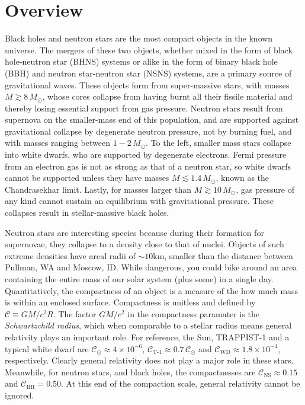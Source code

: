 \chapter{Overview}
\label{chap:chapter-1}


Black holes and neutron stars are the most compact objects in the known universe.  
The mergers of these two objects,
 whether mixed in the form of black hole-neutron star (BHNS) systems or alike in the form of binary black hole (BBH) and neutron star-neutron star (NSNS) systems,
 are a primary source of gravitational waves.  
These objects form from super-massive stars,
 with masses $M\gtrsim 8\,M_{\odot}$,
 whose cores collapse from having burnt all their fissile material and thereby
 losing essential support from gas pressure.
Neutron stars result from supernova on the smaller-mass end of this population,
 and are supported against gravitational collapse by degenerate neutron pressure,
 not by burning fuel,
 and with masses ranging between $1-2\,M_{\odot}$.
To the left,
 smaller mass stars collapse into white dwarfs,
 who are supported by degenerate electrons.  
Fermi pressure from an electron gas is not as strong as that of a neutron star,
 so white dwarfs cannot be supported unless they have masses $M\lesssim 1.4\,M_{\odot}$,
 known as the Chandrasekhar limit.  
Lastly, for masses larger than $M\gtrsim 10\,M_{\odot}$,
 gas pressure of any kind cannot sustain an equilibrium with gravitational pressure.  
These collapses result in stellar-massive black holes.

Neutron stars are interesting species because during their formation for supernovae,
 they collapse to a density close to that of nuclei.
Objects of such extreme densities have areal radii of $\sim 10 \textrm{km}$,
 smaller than the distance between Pullman, WA and Moscow, ID.
While dangerous, you could bike around an area containing the entire mass of our solar system (plus some) in a single day. 
Quantitatively, the compactness of an object is a measure of the how much mass is within an enclosed surface.
Compactness is unitless and defined by $\mathcal{C}\equiv G M/c^2 R$.
The factor $G M/c^2$ in the compactness paramater is the \textit{Schwartzchild radius},
 which when comparable to a stellar radius means general relativity plays an important role.
For reference,
 the Sun, TRAPPIST-1 and a typical white dwarf are
 $\mathcal{C}_{\odot} \approx 4 \times 10^{-6}$,
 $\mathcal{C}_\textrm{T-1} \approx 0.7\,\mathcal{C}_{\odot}$
 and
 $\mathcal{C}_\textrm{WD} \approx 1.8 \times 10^{-4}$,
 respectively.
Clearly general relativity does not play a major role in these stars.
Meanwhile, for neutron stars, and black holes, the compactnesses are 
 $\mathcal{C}_\textrm{NS} \approx 0.15$
 and
 $\mathcal{C}_\textrm{BH} = 0.50$.
At this end of the compaction scale, general relativity cannot be ignored.

